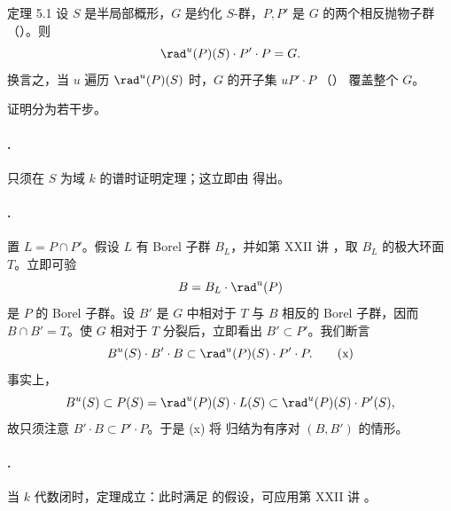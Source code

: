 
\begin{sgastatement}{定理 5.1}
设 \(S\) 是半局部概形，\(G\) 是约化 \(S\)-群，\(P,P'\) 是 \(G\) 的两个相反抛物子群 \textup{（）}。则
\[
 \rad^u(P)(S)\cdot P'\cdot P=G.
\]
换言之，当 \(u\) 遍历 \(\rad^u(P)(S)\) 时，\(G\) 的开子集 \(uP'\cdot P\) \textup{（）} 覆盖整个 \(G\)。
\end{sgastatement}

证明分为若干步。

\paragraph{.}
只须在 \(S\) 为域 \(k\) 的谱时证明定理；这立即由  得出。

\paragraph{.}
置 \(L=P\cap P'\)。假设 \(L\) 有 Borel 子群 \(B_L\)，并如第 XXII 讲 ，取 \(B_L\) 的极大环面 \(T\)。立即可验
\[
 B=B_L\cdot\rad^u(P)
\]
是 \(P\) 的 Borel 子群。设 \(B'\) 是 \(G\) 中相对于 \(T\) 与 \(B\) 相反的 Borel 子群，因而 \(B\cap B'=T\)。使 \(G\) 相对于 \(T\) 分裂后，立即看出 \(B'\subset P'\)。我们断言
\[
 B^u(S)\cdot B'\cdot B
 \subset \rad^u(P)(S)\cdot P'\cdot P.                 \tag{x}\label{sga3:xxvi:theorem:5-1:equation:x}
\]
事实上，
\[
 B^u(S)\subset P(S)
 =\rad^u(P)(S)\cdot L(S)
 \subset\rad^u(P)(S)\cdot P'(S),
\]
故只须注意 \(B'\cdot B\subset P'\cdot P\)。于是 \textup{(x)} 将 归结为有序对 \((B,B')\) 的情形。

\paragraph{.}
当 \(k\) 代数闭时，定理成立：此时满足  的假设，可应用第 XXII 讲 。

